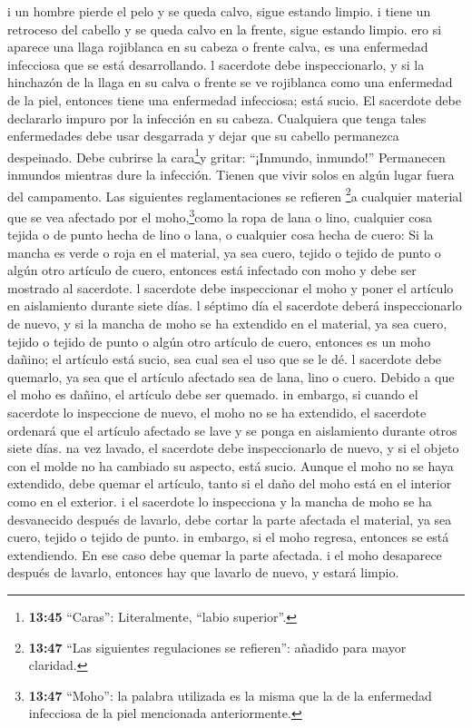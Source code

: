  i un hombre pierde el pelo y se queda calvo, sigue estando
limpio.  i tiene un retroceso del cabello y se queda calvo
en la frente, sigue estando limpio.  ero si aparece una
llaga rojiblanca en su cabeza o frente calva, es una enfermedad
infecciosa que se está desarrollando.  l sacerdote debe
inspeccionarlo, y si la hinchazón de la llaga en su calva o frente se ve
rojiblanca como una enfermedad de la piel,  entonces tiene
una enfermedad infecciosa; está sucio. El sacerdote debe declararlo
impuro por la infección en su cabeza.  Cualquiera que tenga
tales enfermedades debe usar desgarrada y dejar que su cabello
permanezca despeinado. Debe cubrirse la cara\footnote{\textbf{13:45}
  ``Caras'': Literalmente, ``labio superior''.}y gritar: ``¡Inmundo,
inmundo!''  Permanecen inmundos mientras dure la infección.
Tienen que vivir solos en algún lugar fuera del campamento.
 Las siguientes reglamentaciones se refieren \footnote{\textbf{13:47}
  ``Las siguientes regulaciones se refieren'': añadido para mayor
  claridad.}a cualquier material que se vea afectado por el
moho,\footnote{\textbf{13:47} ``Moho'': la palabra utilizada es la misma
  que la de la enfermedad infecciosa de la piel mencionada
  anteriormente.}como la ropa de lana o lino,  cualquier
cosa tejida o de punto hecha de lino o lana, o cualquier cosa hecha de
cuero:  Si la mancha es verde o roja en el material, ya sea
cuero, tejido o tejido de punto o algún otro artículo de cuero, entonces
está infectado con moho y debe ser mostrado al sacerdote. 
l sacerdote debe inspeccionar el moho y poner el artículo en aislamiento
durante siete días.  l séptimo día el sacerdote deberá
inspeccionarlo de nuevo, y si la mancha de moho se ha extendido en el
material, ya sea cuero, tejido o tejido de punto o algún otro artículo
de cuero, entonces es un moho dañino; el artículo está sucio, sea cual
sea el uso que se le dé.  l sacerdote debe quemarlo, ya sea
que el artículo afectado sea de lana, lino o cuero. Debido a que el moho
es dañino, el artículo debe ser quemado.  in embargo, si
cuando el sacerdote lo inspeccione de nuevo, el moho no se ha extendido,
 el sacerdote ordenará que el artículo afectado se lave y
se ponga en aislamiento durante otros siete días.  na vez
lavado, el sacerdote debe inspeccionarlo de nuevo, y si el objeto con el
molde no ha cambiado su aspecto, está sucio. Aunque el moho no se haya
extendido, debe quemar el artículo, tanto si el daño del moho está en el
interior como en el exterior.  i el sacerdote lo
inspecciona y la mancha de moho se ha desvanecido después de lavarlo,
debe cortar la parte afectada el material, ya sea cuero, tejido o tejido
de punto.  in embargo, si el moho regresa, entonces se está
extendiendo. En ese caso debe quemar la parte afectada.  i
el moho desaparece después de lavarlo, entonces hay que lavarlo de
nuevo, y estará limpio.

